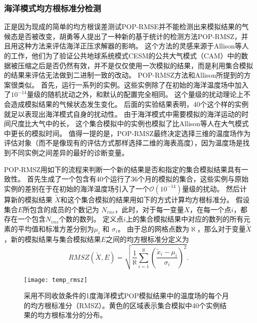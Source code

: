 \subsubsection{海洋模式均方根标准分检测}\label{verify:rmsz}

正是因为现成的简单的均方根误差测试POP-RMSE并不能检测出来模拟结果的气候态是否被改变，胡勇等人\cite{yong2015}提出了一种新的基于统计的检测方法POP-RMSZ，并且用这种方法来评估海洋正压求解器的影响。 
这个方法的灵感来源于Allison等人的工作\cite{baker2014methodology}，他们为了验证公共地球系统模式CESM的公共大气模式（CAM）中的数据被压缩之后是否仍然有效，并不是仅仅使用一次模拟的结果，而是利用集合模拟的结果来评估无法做到二进制一致的改动。 
POP-RMSZ方法和Allison所提到的方案很类似\cite{baker2014methodology}。
首先，运行一系列的实例。这些实例除了在初始的海洋温度场中加入了$10^{-14}$量级的随机扰动之外，和默认的配置完全相同。 
这个量级的扰动理论上不会造成模拟结果的气候状态发生变化。 
后面的实验结果表明，40个这个样的实例就足以表现出海洋模式自身的扰动性。
由于海洋模式中需要模拟的海洋运动的时间尺度比大气中的长， 这个集合模拟中的实例也模拟了比Allison等人在大气模式中更长的模拟时间。 
值得一提的是，POP-RMSZ最终决定选择三维的温度场作为评估对象（而不是像现有的评估方式那样选择二维的海表高度），因为温度场是找到不同实例之间差异的最好的诊断变量。 
 
 
POP-RMSZ用如下的流程来判断一个新的结果是否和指定的集合模拟结果具有一致性。 
首先生成了一个包含有40个运行了36个月的模拟的集合，这些实例与原始实例的差别在于在初始的海洋温度场引入了一个$\mathcal{O}(10^{-14})$量级的扰动。 
然后计算新的模拟结果 $\tilde{{X}}$和这个集合模拟的结果用如下的方式计算均方根标准分。 
假设集合$E$所包含的成员的个数记为 $N_{ens}$，此时，对于每一变量$X$，在每一个点$i$，都存在一个包含$N_{ens}$个数的数列。
定义点$i$上的集合模拟结果中对应的数列的所有元素的平均值和标准方差分别为$\mu_i$ 和 $\sigma_i$。 
由于总的网格点数为$\aleph$，那么对于变量$\tilde{{X}}$，新的模拟结果与集合模拟结果$E$之间的均方根标准分定义为
\begin{equation}
 RMSZ(\tilde{X}, E) = \sqrt{\frac{1}{\aleph}\sum_{i=1}^\aleph(\frac{\tilde{x}_i -\mu_i}{\sigma_i})^2}. 
\label{e:rmsz}
\end{equation}


\begin{figure}%
\begin{center}
\texttt{[image: temp\_rmsz]}
\end{center}
\caption[] {采用不同收敛条件的1度海洋模式POP模拟结果中的温度场的每个月的均方根标准分（RMSZ）。黄色的区域表示集合模拟中40个实例结果的均方根标准分的分布。 }
\label{fig:ssh_rmsz_t}
\end{figure}

